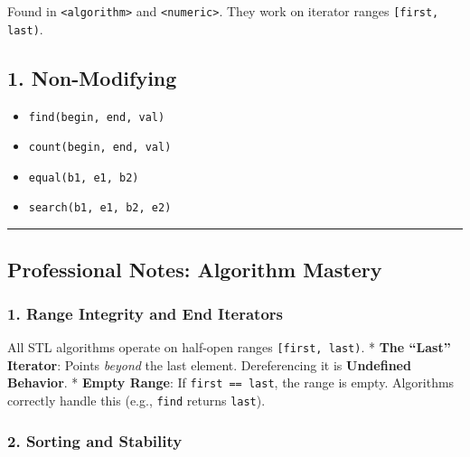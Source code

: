 Found in \passthrough{\lstinline!<algorithm>!} and
\passthrough{\lstinline!<numeric>!}. They work on iterator ranges
\passthrough{\lstinline![first, last)!}.

\hypertarget{non-modifying}{%
\subsection{1. Non-Modifying}\label{non-modifying}}

\begin{itemize}
\tightlist
\item
  \passthrough{\lstinline!find(begin, end, val)!}
\item
  \passthrough{\lstinline!count(begin, end, val)!}
\item
  \passthrough{\lstinline!equal(b1, e1, b2)!}
\item
  \passthrough{\lstinline!search(b1, e1, b2, e2)!}
\end{itemize}

\begin{center}\rule{0.5\linewidth}{0.5pt}\end{center}

\hypertarget{professional-notes-algorithm-mastery}{%
\subsection{Professional Notes: Algorithm
Mastery}\label{professional-notes-algorithm-mastery}}

\hypertarget{range-integrity-and-end-iterators}{%
\subsubsection{1. Range Integrity and End
Iterators}\label{range-integrity-and-end-iterators}}

All STL algorithms operate on half-open ranges
\passthrough{\lstinline![first, last)!}. * \textbf{The ``Last''
Iterator}: Points \emph{beyond} the last element. Dereferencing it is
\textbf{Undefined Behavior}. * \textbf{Empty Range}: If
\passthrough{\lstinline!first == last!}, the range is empty. Algorithms
correctly handle this (e.g., \passthrough{\lstinline!find!} returns
\passthrough{\lstinline!last!}).

\hypertarget{sorting-and-stability}{%
\subsubsection{2. Sorting and Stability}\label{sorting-and-stability}}

